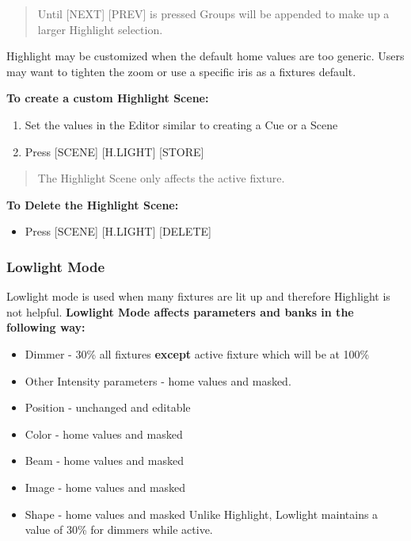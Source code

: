 \documentclass[
]{article}
\providecommand{\tightlist}{%
  \setlength{\itemsep}{0pt}\setlength{\parskip}{0pt}}
\begin{document}
\begin{quote}
Until {[}NEXT{]} {[}PREV{]} is pressed Groups will be appended to make up a larger Highlight selection.
\end{quote}

Highlight may be customized when the default home values are too generic. Users may want to tighten the zoom or use a specific iris as a fixtures default.

\textbf{To create a custom Highlight Scene:}

\begin{enumerate}
\def\labelenumi{\arabic{enumi}.}
\item
  Set the values in the Editor similar to creating a Cue or a Scene
\item
  Press {[}SCENE{]} {[}H.LIGHT{]} {[}STORE{]}
\end{enumerate}

\begin{quote}
The Highlight Scene only affects the active fixture.
\end{quote}

\textbf{To Delete the Highlight Scene:}

\begin{itemize}
\tightlist
\item
  Press {[}SCENE{]} {[}H.LIGHT{]} {[}DELETE{]}
\end{itemize}

\hypertarget{lowlight-mode}{%
\subsubsection{Lowlight Mode}\label{lowlight-mode}}

Lowlight mode is used when many fixtures are lit up and therefore Highlight is not helpful. \textbf{Lowlight Mode affects parameters and banks in the following way:}

\begin{itemize}
\item
  Dimmer - 30\% all fixtures \textbf{except} active fixture which will be at 100\%
\item
  Other Intensity parameters - home values and masked.
\item
  Position - unchanged and editable
\item
  Color - home values and masked
\item
  Beam - home values and masked
\item
  Image - home values and masked
\item
  Shape - home values and masked Unlike Highlight, Lowlight maintains a value of 30\% for dimmers while active.
\end{itemize}
\end{document}
